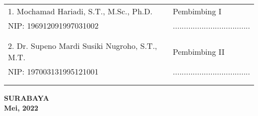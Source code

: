   \begingroup
    \setlength{\tabcolsep}{0pt}

    \noindent
    \begin{tabularx}{\textwidth}{X l}
      1. Mochamad Hariadi, S.T., M.Sc., Ph.D.          & Pembimbing I \\
      NIP: 196912091997031002        & ................................... \\
      &  \\
      &  \\
      2. Dr. Supeno Mardi Susiki Nugroho, S.T., M.T.     & Pembimbing II \\
      NIP: 197003131995121001        & ................................... \\
      &  \\
      &  \\
    \end{tabularx}
  \endgroup

  \vspace{12ex}




  \begin{center}
    \textbf{SURABAYA\\Mei, 2022}
  \end{center}
\endgroup
